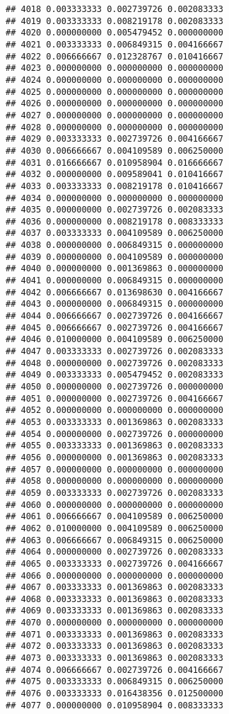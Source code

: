 \documentclass[
]{article}
\begin{document}
\begin{verbatim}
## 4018 0.003333333 0.002739726 0.002083333
## 4019 0.003333333 0.008219178 0.002083333
## 4020 0.000000000 0.005479452 0.000000000
## 4021 0.003333333 0.006849315 0.004166667
## 4022 0.006666667 0.012328767 0.010416667
## 4023 0.000000000 0.000000000 0.000000000
## 4024 0.000000000 0.000000000 0.000000000
## 4025 0.000000000 0.000000000 0.000000000
## 4026 0.000000000 0.000000000 0.000000000
## 4027 0.000000000 0.000000000 0.000000000
## 4028 0.000000000 0.000000000 0.000000000
## 4029 0.003333333 0.002739726 0.004166667
## 4030 0.006666667 0.004109589 0.006250000
## 4031 0.016666667 0.010958904 0.016666667
## 4032 0.000000000 0.009589041 0.010416667
## 4033 0.003333333 0.008219178 0.010416667
## 4034 0.000000000 0.000000000 0.000000000
## 4035 0.000000000 0.002739726 0.002083333
## 4036 0.000000000 0.008219178 0.008333333
## 4037 0.003333333 0.004109589 0.006250000
## 4038 0.000000000 0.006849315 0.000000000
## 4039 0.000000000 0.004109589 0.000000000
## 4040 0.000000000 0.001369863 0.000000000
## 4041 0.000000000 0.006849315 0.000000000
## 4042 0.006666667 0.013698630 0.004166667
## 4043 0.000000000 0.006849315 0.000000000
## 4044 0.006666667 0.002739726 0.004166667
## 4045 0.006666667 0.002739726 0.004166667
## 4046 0.010000000 0.004109589 0.006250000
## 4047 0.003333333 0.002739726 0.002083333
## 4048 0.000000000 0.002739726 0.002083333
## 4049 0.003333333 0.005479452 0.002083333
## 4050 0.000000000 0.002739726 0.000000000
## 4051 0.000000000 0.002739726 0.004166667
## 4052 0.000000000 0.000000000 0.000000000
## 4053 0.003333333 0.001369863 0.002083333
## 4054 0.000000000 0.002739726 0.000000000
## 4055 0.003333333 0.001369863 0.002083333
## 4056 0.000000000 0.001369863 0.002083333
## 4057 0.000000000 0.000000000 0.000000000
## 4058 0.000000000 0.000000000 0.000000000
## 4059 0.003333333 0.002739726 0.002083333
## 4060 0.000000000 0.000000000 0.000000000
## 4061 0.006666667 0.004109589 0.006250000
## 4062 0.010000000 0.004109589 0.006250000
## 4063 0.006666667 0.006849315 0.006250000
## 4064 0.000000000 0.002739726 0.002083333
## 4065 0.003333333 0.002739726 0.004166667
## 4066 0.000000000 0.000000000 0.000000000
## 4067 0.003333333 0.001369863 0.002083333
## 4068 0.003333333 0.001369863 0.002083333
## 4069 0.003333333 0.001369863 0.002083333
## 4070 0.000000000 0.000000000 0.000000000
## 4071 0.003333333 0.001369863 0.002083333
## 4072 0.003333333 0.001369863 0.002083333
## 4073 0.003333333 0.001369863 0.002083333
## 4074 0.006666667 0.002739726 0.004166667
## 4075 0.003333333 0.006849315 0.006250000
## 4076 0.003333333 0.016438356 0.012500000
## 4077 0.000000000 0.010958904 0.008333333

\end{verbatim}
\end{document}

